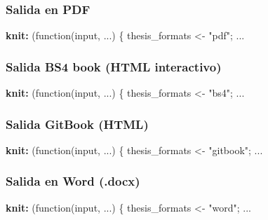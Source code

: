 \documentclass[a4paper, nobind]{templates/ociamthesis}
\newenvironment{Shaded}{\begin{snugshade}}{\end{snugshade}}
\newcommand{\AttributeTok}[1]{\textcolor[rgb]{0.13,0.29,0.53}{#1}}
\newcommand{\FunctionTok}[1]{\textcolor[rgb]{0.13,0.29,0.53}{\textbf{#1}}}
\newcommand{\KeywordTok}[1]{\textcolor[rgb]{0.13,0.29,0.53}{\textbf{#1}}}
\renewenvironment{Shaded}
{
  \vspace{10pt}%
  \begin{snugshade}%
}{%
  \end{snugshade}%
  \vspace{8pt}%
}
\begin{document}
\subsubsection{Salida en PDF}\label{salida-en-pdf}

\begin{Shaded}
\begin{Highlighting}[]
\FunctionTok{knit}\KeywordTok{:}\AttributeTok{ (function(input, ...) \{}
\AttributeTok{    thesis\_formats \textless{}{-} "pdf";}
\AttributeTok{    ...}
\end{Highlighting}
\end{Shaded}

\subsubsection{Salida BS4 book (HTML interactivo)}\label{salida-bs4-book-html-interactivo}

\begin{Shaded}
\begin{Highlighting}[]
\FunctionTok{knit}\KeywordTok{:}\AttributeTok{ (function(input, ...) \{}
\AttributeTok{    thesis\_formats \textless{}{-} "bs4";}
\AttributeTok{    ...}
\end{Highlighting}
\end{Shaded}

\subsubsection{Salida GitBook (HTML)}\label{salida-gitbook-html}

\begin{Shaded}
\begin{Highlighting}[]
\FunctionTok{knit}\KeywordTok{:}\AttributeTok{ (function(input, ...) \{}
\AttributeTok{    thesis\_formats \textless{}{-} "gitbook";}
\AttributeTok{    ...}
\end{Highlighting}
\end{Shaded}

\subsubsection{Salida en Word (.docx)}\label{salida-en-word-.docx}

\begin{Shaded}
\begin{Highlighting}[]
\FunctionTok{knit}\KeywordTok{:}\AttributeTok{ (function(input, ...) \{}
\AttributeTok{    thesis\_formats \textless{}{-} "word";}
\AttributeTok{    ...}
\end{Highlighting}
\end{Shaded}
\end{document}
